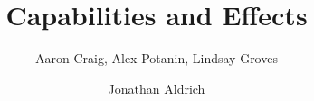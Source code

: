 \documentclass[sigplan,10pt,review]{acmart}\settopmatter{printfolios=true,printccs=false,printacmref=false}
\begin{document}
\title[Capabilities and Effects]{Capabilities and Effects}


\author{Aaron Craig, Alex Potanin, Lindsay Groves}

\author{Jonathan Aldrich}

\end{document}
